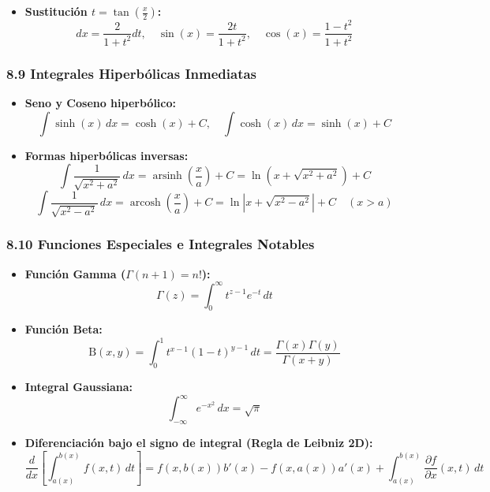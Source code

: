 \documentclass[11pt,a4paper]{article}
\begin{document}
\begin{itemize}
  \item \textbf{Sustitución $t = \tan\left(\frac{x}{2}\right)$:}
  \[
    dx = \frac{2}{1 + t^2} dt, \quad \sin(x) = \frac{2t}{1 + t^2}, \quad \cos(x) = \frac{1 - t^2}{1 + t^2}
  \]
\end{itemize}

\subsubsection*{8.9 Integrales Hiperbólicas Inmediatas}

\begin{itemize}
  \item \textbf{Seno y Coseno hiperbólico:}
  \[
    \int \sinh(x) \, dx = \cosh(x) + C, \quad \int \cosh(x) \, dx = \sinh(x) + C
  \]
  \item \textbf{Formas hiperbólicas inversas:}
  \[
    \int \frac{1}{\sqrt{x^2 + a^2}} \, dx = \operatorname{arsinh}\left(\frac{x}{a}\right) + C = \ln\left(x + \sqrt{x^2 + a^2}\right) + C
  \]
  \[
    \int \frac{1}{\sqrt{x^2 - a^2}} \, dx = \operatorname{arcosh}\left(\frac{x}{a}\right) + C = \ln\left|x + \sqrt{x^2 - a^2}\right| + C \quad (x > a)
  \]
\end{itemize}

\subsubsection*{8.10 Funciones Especiales e Integrales Notables}

\begin{itemize}
  \item \textbf{Función Gamma ($\Gamma(n + 1) = n!$):}
  \[
    \Gamma(z) = \int_0^\infty t^{z-1} e^{-t} \, dt
  \]
  \item \textbf{Función Beta:}
  \[
    \text{B}(x, y) = \int_0^1 t^{x-1} (1 - t)^{y-1} \, dt = \frac{\Gamma(x)\Gamma(y)}{\Gamma(x + y)}
  \]
  \item \textbf{Integral Gaussiana:}
  \[
    \int_{-\infty}^\infty e^{-x^2} \, dx = \sqrt{\pi}
  \]
  \item \textbf{Diferenciación bajo el signo de integral (Regla de Leibniz 2D):}
  \[
    \frac{d}{dx} \left[ \int_{a(x)}^{b(x)} f(x, t) \, dt \right] = f(x, b(x))b'(x) - f(x, a(x))a'(x) + \int_{a(x)}^{b(x)} \frac{\partial f}{\partial x}(x, t) \, dt
  \]
\end{itemize}
\end{document}
